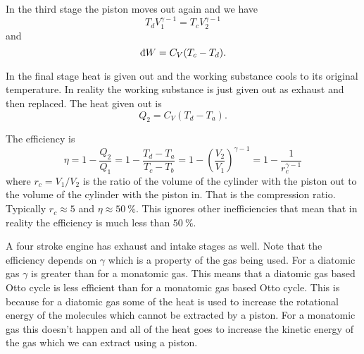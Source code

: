 \documentclass[a4paper]{article}
\newcommand{\ddbar}[1]{\text{\dj}{#1}}
\begin{document}
    In the third stage the piston moves out again and we have
    \[T_dV_1^{\gamma-1} = T_cV_2^{\gamma-1}\]
    and
    \[\ddbar{W} = C_V(T_c - T_d).\]
    
    In the final stage heat is given out and the working substance cools to its original temperature.
    In reality the working substance is just given out as exhaust and then replaced.
    The heat given out is
    \[Q_2 = C_V(T_d - T_a).\]
    
    The efficiency is
    \[\eta = 1 - \frac{Q_2}{Q_1} = 1 - \frac{T_d - T_a}{T_c - T_b} = 1 - \left(\frac{V_2}{V_1}\right)^{\gamma-1} = 1 - \frac{1}{r_c^{\gamma-1}}\]
    where \(r_c = V_1/V_2\) is the ratio of the volume of the cylinder with the piston out to the volume of the cylinder with the piston in.
    That is the compression ratio.
    Typically \(r_c \approx 5\) and \(\eta\approx\SI{50}{\percent}\).
    This ignores other inefficiencies that mean that in reality the efficiency is much less than \(\SI{50}{\percent}\).
    
    A four stroke engine has exhaust and intake stages as well.
    Note that the efficiency depends on \(\gamma\) which is a property of the gas being used.
    For a diatomic gas \(\gamma\) is greater than for a monatomic gas.
    This means that a diatomic gas based Otto cycle is less efficient than for a monatomic gas based Otto cycle.
    This is because for a diatomic gas some of the heat is used to increase the rotational energy of the molecules which cannot be extracted by a piston.
    For a monatomic gas this doesn't happen and all of the heat goes to increase the kinetic energy of the gas which we can extract using a piston.
    
\end{document}
